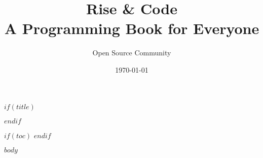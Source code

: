 \documentclass[12pt,a4paper]{book}
\title{\Huge Rise \& Code\\\large A Programming Book for Everyone}
\author{Open Source Community}
\date{\today}
\begin{document}
$if(title)$
\maketitle
$endif$

$if(toc)$
\tableofcontents
$endif$

$body$
\end{document}
